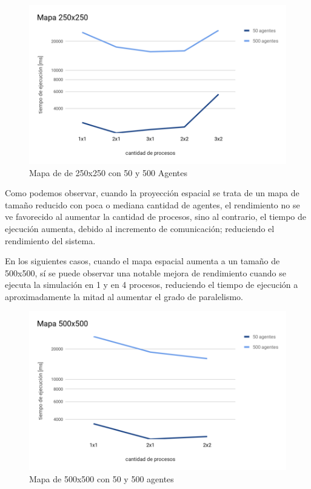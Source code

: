 \begin{figure}[H]
	\centering
	\includegraphics{Rendimiento2.png}
	\caption{Mapa de de 250x250 con 50 y 500 Agentes}
\end{figure}

Como podemos observar, cuando la proyección espacial se trata de un mapa
de tamaño reducido con poca o mediana cantidad de agentes, el
rendimiento no se ve favorecido al aumentar la cantidad de procesos,
sino al contrario, el tiempo de ejecución aumenta, debido al incremento
de comunicación; reduciendo el rendimiento del sistema.

En los siguientes casos, cuando el mapa espacial aumenta a un tamaño de
500x500, sí se puede observar una notable mejora de rendimiento cuando
se ejecuta la simulación en 1 y en 4 procesos, reduciendo el tiempo de
ejecución a aproximadamente la mitad al aumentar el grado de
paralelismo.

\begin{figure}[H]
	\centering
	\includegraphics{Rendimiento3.png}
	\caption{Mapa de 500x500 con 50 y 500 agentes}
\end{figure}


